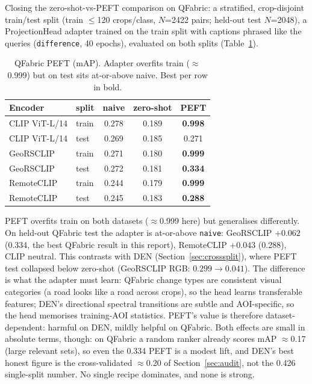 \documentclass{article}
\begin{document}
Closing the zero-shot-vs-PEFT comparison on QFabric: a stratified, crop-disjoint
train/test split (train $\leq$120 crops/class, $N$=2422 pairs; held-out test
$N$=2048), a ProjectionHead adapter trained on the train split with captions
phrased like the queries (\texttt{difference}, 40 epochs), evaluated on both
splits (Table~\ref{tab:qfabricpeft}).

\begin{table}[H]
    \centering
    \caption{QFabric PEFT (mAP). Adapter overfits train ($\approx$0.999) but on
    test sits at-or-above naive. Best per row in bold.}
    \label{tab:qfabricpeft}
    \begin{tabular}{llccc}
        \toprule
        \textbf{Encoder} & \textbf{split} & \textbf{naive} & \textbf{zero-shot} & \textbf{PEFT} \\
        \midrule
        CLIP ViT-L/14 & train & 0.278 & 0.189 & \textbf{0.998} \\
        CLIP ViT-L/14 & test  & 0.269 & 0.185 & 0.271 \\
        GeoRSCLIP     & train & 0.271 & 0.180 & \textbf{0.999} \\
        GeoRSCLIP     & test  & 0.272 & 0.181 & \textbf{0.334} \\
        RemoteCLIP    & train & 0.244 & 0.179 & \textbf{0.999} \\
        RemoteCLIP    & test  & 0.245 & 0.183 & \textbf{0.288} \\
        \bottomrule
    \end{tabular}
\end{table}

PEFT overfits train on both datasets ($\approx$0.999 here) but
generalises differently. On held-out QFabric test the adapter is at-or-above
\texttt{naive}: GeoRSCLIP $+0.062$ (0.334, the best QFabric result in this
report), RemoteCLIP $+0.043$ (0.288), CLIP neutral. This contrasts with DEN
(Section~\ref{sec:crosssplit}), where PEFT test collapsed below zero-shot
(GeoRSCLIP RGB: $0.299 \rightarrow 0.041$). The difference is what the adapter
must learn: QFabric change types are consistent visual categories (a road looks
like a road across crops), so the head learns transferable features; DEN's
directional spectral transitions are subtle and AOI-specific, so the head
memorises training-AOI statistics. PEFT's value is therefore dataset-dependent:
harmful on DEN, mildly helpful on QFabric. Both effects are small in absolute
terms, though: on QFabric a random ranker already scores mAP $\approx$0.17
(large relevant sets), so even the 0.334 PEFT is a modest lift, and DEN's best
honest figure is the cross-validated $\approx$0.20 of Section~\ref{sec:audit},
not the 0.426 single-split number. No single recipe dominates, and none is
strong.
\end{document}
